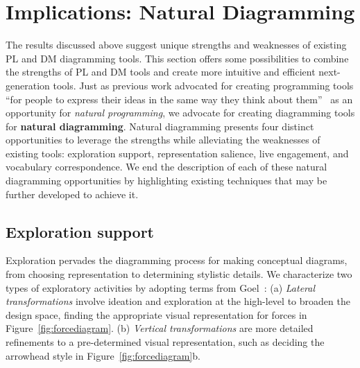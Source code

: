 
    


\section{Implications: Natural Diagramming}

The results discussed above suggest unique strengths and weaknesses of existing PL and DM diagramming tools. This section offers some possibilities to combine the strengths of PL and DM tools and create more intuitive and efficient next-generation tools. Just as previous work advocated for creating programming tools ``for people to express their ideas in the same way they think about them''~\cite{myers_natural_2004} as an opportunity for \emph{natural programming}, we advocate for creating diagramming tools for \textbf{natural diagramming}. Natural diagramming presents four distinct opportunities to leverage the strengths while alleviating the weaknesses of existing tools: exploration support, representation salience, live engagement, and vocabulary correspondence. We end the description of each of these natural diagramming opportunities by highlighting existing techniques that may be further developed to achieve it. 

\subsection{Exploration support}

Exploration pervades the diagramming process for making conceptual diagrams, from choosing representation to determining stylistic details. We characterize two types of exploratory activities by adopting terms from Goel~\cite{sketchesOfThought}: (a) \emph{Lateral transformations} involve ideation and exploration at the high-level to broaden the design space, \eg{} finding the appropriate visual representation for forces in Figure~\ref{fig:forcediagram}. (b) \emph{Vertical transformations} 
 are more detailed refinements to a pre-determined visual representation, such as deciding the arrowhead style in Figure~\ref{fig:forcediagram}b.

